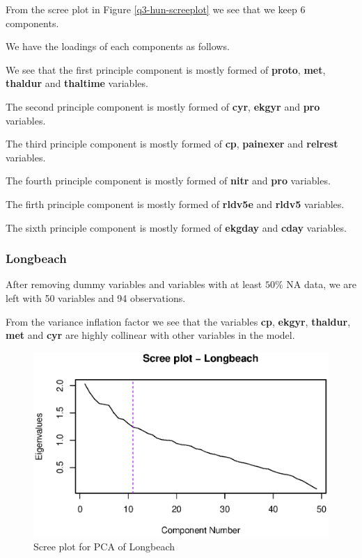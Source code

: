 \documentclass[a4paper]{article}
\begin{document}
From the scree plot in Figure \ref{q3-hun-screeplot} we see that we keep 6 components.

We have the loadings of each components as follows.



We see that the first principle component is mostly formed of \textbf{proto}, \textbf{met}, \textbf{thaldur} and \textbf{thaltime} variables.

The second principle component is mostly formed of \textbf{cyr}, \textbf{ekgyr} and \textbf{pro} variables.

The third principle component is mostly formed of \textbf{cp}, \textbf{painexer} and \textbf{relrest} variables.

The fourth principle component is mostly formed of \textbf{nitr} and \textbf{pro} variables.

The firth principle component is mostly formed of \textbf{rldv5e} and \textbf{rldv5} variables.

The sixth principle component is mostly formed of \textbf{ekgday} and \textbf{cday} variables.

\subsubsection{Longbeach}

After removing dummy variables and variables with at least $50\%$ NA data, we are left with 50 variables and 94 observations.



From the variance inflation factor we see that the variables \textbf{cp}, \textbf{ekgyr}, \textbf{thaldur}, \textbf{met} and \textbf{cyr} are highly collinear with other variables in the model.

\begin{figure}[H]
	\begin{center}
		\includegraphics[width=12cm]{question3output/lonscreeplot.eps}
	\end{center}
	\caption{Scree plot for PCA of Longbeach}
	\label{q3-lon-screeplot}
\end{figure}
\end{document}

